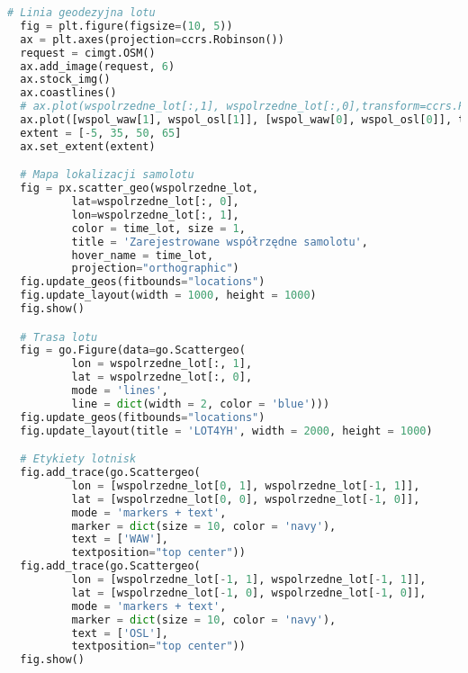 \documentclass[fleqn,10pt,a4paper]{article}
\begin{document}
\newpage
\begin{lstlisting}[language = Python, caption = Mapy lotu, label = mapy]
  # Linia geodezyjna lotu
  fig = plt.figure(figsize=(10, 5))
  ax = plt.axes(projection=ccrs.Robinson())
  request = cimgt.OSM()
  ax.add_image(request, 6)
  ax.stock_img()
  ax.coastlines()
  # ax.plot(wspolrzedne_lot[:,1], wspolrzedne_lot[:,0],transform=ccrs.PlateCarree(),color='b')
  ax.plot([wspol_waw[1], wspol_osl[1]], [wspol_waw[0], wspol_osl[0]], transform=ccrs.Geodetic(), color='r')
  extent = [-5, 35, 50, 65]
  ax.set_extent(extent)

  # Mapa lokalizacji samolotu
  fig = px.scatter_geo(wspolrzedne_lot,
          lat=wspolrzedne_lot[:, 0], 
          lon=wspolrzedne_lot[:, 1], 
          color = time_lot, size = 1, 
          title = 'Zarejestrowane współrzędne samolotu', 
          hover_name = time_lot, 
          projection="orthographic")
  fig.update_geos(fitbounds="locations")
  fig.update_layout(width = 1000, height = 1000)
  fig.show()

  # Trasa lotu
  fig = go.Figure(data=go.Scattergeo(
          lon = wspolrzedne_lot[:, 1],
          lat = wspolrzedne_lot[:, 0],
          mode = 'lines',
          line = dict(width = 2, color = 'blue')))
  fig.update_geos(fitbounds="locations")
  fig.update_layout(title = 'LOT4YH', width = 2000, height = 1000)

  # Etykiety lotnisk
  fig.add_trace(go.Scattergeo(
          lon = [wspolrzedne_lot[0, 1], wspolrzedne_lot[-1, 1]],
          lat = [wspolrzedne_lot[0, 0], wspolrzedne_lot[-1, 0]],
          mode = 'markers + text',
          marker = dict(size = 10, color = 'navy'),
          text = ['WAW'],
          textposition="top center"))
  fig.add_trace(go.Scattergeo(
          lon = [wspolrzedne_lot[-1, 1], wspolrzedne_lot[-1, 1]],
          lat = [wspolrzedne_lot[-1, 0], wspolrzedne_lot[-1, 0]],
          mode = 'markers + text',
          marker = dict(size = 10, color = 'navy'),
          text = ['OSL'],
          textposition="top center"))
  fig.show()

\end{lstlisting}
\newpage
\end{document}
